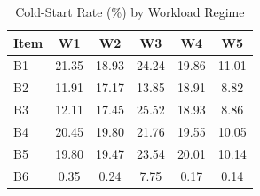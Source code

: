 \begin{table}[htbp]
\centering
\caption{Cold-Start Rate (\%) by Workload Regime}
\label{tab:csr_workload}
\begin{tabular}{lccccc}
\hline
Item & W1 & W2 & W3 & W4 & W5 \\
\hline
B1 & 21.35 & 18.93 & 24.24 & 19.86 & 11.01 \\
B2 & 11.91 & 17.17 & 13.85 & 18.91 & 8.82 \\
B3 & 12.11 & 17.45 & 25.52 & 18.93 & 8.86 \\
B4 & 20.45 & 19.80 & 21.76 & 19.55 & 10.05 \\
B5 & 19.80 & 19.47 & 23.54 & 20.01 & 10.14 \\
B6 & 0.35 & 0.24 & 7.75 & 0.17 & 0.14 \\
\hline
\end{tabular}
\end{table}